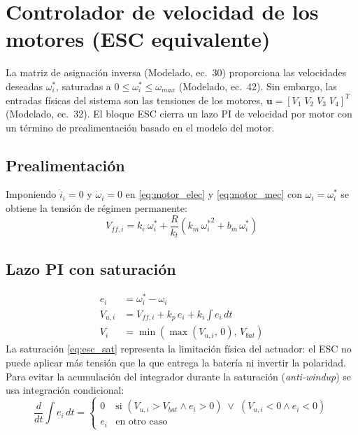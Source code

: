 \section{Controlador de velocidad de los motores (ESC equivalente)}
\label{sec:esc}

La matriz de asignación inversa (Modelado, ec.~30) proporciona las velocidades
deseadas $\omega_i^{*}$, saturadas a $0 \le \omega_i^{*} \le \omega_{max}$
(Modelado, ec.~42). Sin embargo, las entradas físicas del sistema son las tensiones
de los motores, $\mathbf{u} = [V_1\;V_2\;V_3\;V_4]^T$ (Modelado, ec.~32). El bloque
ESC cierra un lazo PI de velocidad por motor con un término de prealimentación
basado en el modelo del motor.

\subsection{Prealimentación}
Imponiendo $\dot i_i = 0$ y $\dot\omega_i = 0$ en \eqref{eq:motor_elec} y
\eqref{eq:motor_mec} con $\omega_i = \omega_i^{*}$ se obtiene la tensión de régimen
permanente:
\begin{equation}
  V_{ff,i} = k_e\, \omega_i^{*} + \frac{R}{k_t}\left(k_m\, {\omega_i^{*}}^2 + b_m\, \omega_i^{*}\right)
\end{equation}

\subsection{Lazo PI con saturación}
\begin{align}
  e_i &= \omega_i^{*} - \omega_i \\
  V_{u,i} &= V_{ff,i} + k_p\, e_i + k_i \int e_i\, dt \\
  V_i &= \min\!\left(\max\left(V_{u,i},\,0\right),\, V_{bat}\right)
  \label{eq:esc_sat}
\end{align}
La saturación \eqref{eq:esc_sat} representa la limitación física del actuador: el
ESC no puede aplicar más tensión que la que entrega la batería ni invertir la
polaridad. Para evitar la acumulación del integrador durante la saturación
(\emph{anti-windup}) se usa integración condicional:
\begin{equation}
  \frac{d}{dt}\int e_i\,dt =
  \begin{cases}
    0   & \text{si } (V_{u,i} > V_{bat} \wedge e_i > 0) \;\vee\; (V_{u,i} < 0 \wedge e_i < 0) \\
    e_i & \text{en otro caso}
  \end{cases}
\end{equation}

